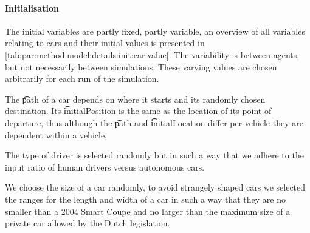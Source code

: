 \paragraph{Initialisation}
\label{par:method:model:details:initialization}
The initial variables are partly fixed, partly variable, an overview of all variables relating to cars and their initial values is presented in \cref{tab:par:method:model:details:init:car:value}. The variability is between agents, but not necessarily between simulations. These varying values are chosen arbitrarily for each run of the simulation.

The \t{path} of a car depends on where it starts and its randomly chosen destination. Its \t{initialPosition} is the same as the location of its point of departure, thus although the \t{path} and \t{initialLocation} differ per vehicle they are dependent within a vehicle. 

The type of driver is selected randomly but in such a way that we adhere to the input ratio of human drivers versus autonomous cars.

We choose the size of a car randomly, to avoid strangely shaped cars we selected the ranges for the length and width of a car in such a way that they are no smaller than a 2004 Smart Coupe and no larger than the maximum size of a private car allowed by the Dutch legislation. 


